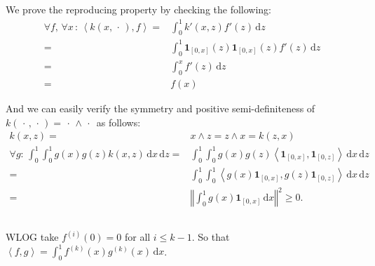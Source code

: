 \documentclass[11pt,a4paper]{ctexart}
\numberwithin{equation}{section}%
\begin{document}
\subsection{}

We prove the reproducing property by checking the following:
\begin{align*}
    \forall f,\,\forall x\,:\,\left\langle k(x,\, \cdot \, ), f \right\rangle  =& \int_0^1 k'(x,z)f'(z)\,\mathrm{d}z\\
    =& \int_0^1 \mathbf{1}_{[0,x]}(z)\mathbf{1}_{[0,x]}(z)f'(z)\,\mathrm{d}z\\
    =& \int_0^x f'(z)\,\mathrm{d}z\\
    =& f(x)
\end{align*}

And we can easily verify the symmetry and positive semi-definiteness of $ k(\, \cdot \, ,\, \cdot \, ) = \, \cdot \, \wedge \, \cdot \,  $ as follows:
\begin{align*}
    k(x,z) = & x\wedge z = z\wedge x = k(z,x)\\
    \forall g:\, \int_0^1\int_0^1 g(x)g(z)k(x,z)\,\mathrm{d}x\,\mathrm{d}z = & \int_0^1\int_0^1 g(x)g(z)\left\langle \mathbf{1}_{[0,x]},\mathbf{1}_{[0,z]} \right\rangle \,\mathrm{d}x\,\mathrm{d}z\\
    =& \int_0^1\int_0^1 \left\langle g(x)\mathbf{1}_{[0,x]}, g(z)\mathbf{1}_{[0,z]}  \right\rangle \,\mathrm{d}x\,\mathrm{d}z\\
    =& \left\Vert \int_0^1 g(x)\mathbf{1}_{[0,x]} \,\mathrm{d}x \right\Vert ^2\geq 0.
\end{align*}


\subsection{}

WLOG take $ f^{(i)}(0)=0 $ for all $ i\leq k-1 $. So that $ \left\langle f,g \right\rangle = \int _0^1 f^{(k)}(x)g^{(k)}(x) \,\mathrm{d}x  $.
\end{document}
